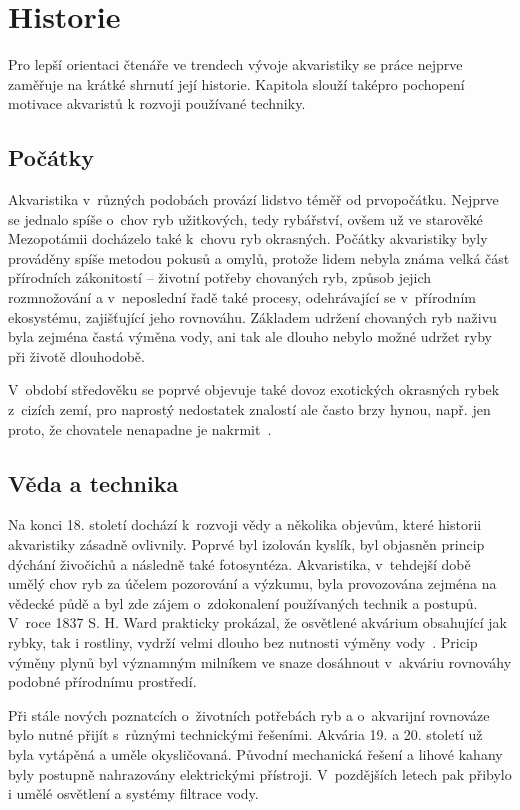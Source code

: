\section{Historie}
    Pro lepší orientaci čtenáře ve trendech vývoje akvaristiky se práce nejprve zaměřuje na krátké shrnutí její historie. Kapitola slouží taképro pochopení motivace akvaristů k rozvoji používané techniky.
\subsection{Počátky}
Akvaristika v~různých podobách provází lidstvo téměř od prvopočátku. Nejprve se jednalo spíše o~chov ryb užitkových, tedy rybářství, ovšem už ve starověké Mezopotámii docházelo také k~chovu ryb okrasných. Počátky akvaristiky byly prováděny spíše metodou pokusů a omylů, protože lidem nebyla známa velká část přírodních zákonitostí -- životní potřeby chovaných ryb, způsob jejich rozmnožování a v~neposlední řadě také procesy, odehrávající se v~přírodním ekosystému, zajišťující jeho rovnováhu. Základem udržení chovaných ryb naživu byla zejména častá výměna vody, ani tak ale dlouho nebylo možné udržet ryby při životě dlouhodobě. 

V~období středověku se poprvé objevuje také dovoz exotických okrasných rybek z~cizích zemí, pro naprostý nedostatek znalostí ale často brzy hynou, např. jen proto, že chovatele nenapadne je nakrmit~\cite{vitek_akvaristika}.

\subsection{Věda a technika}
Na konci 18. století dochází k~rozvoji vědy a několika objevům, které historii akvaristiky zásadně ovlivnily. Poprvé byl izolován kyslík, byl objasněn princip dýchání živočichů a následně také fotosyntéza. Akvaristika, v~tehdejší době umělý chov ryb za účelem pozorování a výzkumu, byla provozována zejména na vědecké půdě a byl zde zájem o~zdokonalení používaných technik a postupů. V~roce 1837 S. H. Ward prakticky prokázal, že osvětlené akvárium obsahující jak rybky, tak i rostliny, vydrží velmi dlouho bez nutnosti výměny vody~\cite{vitek_akvaristika}. Pricip výměny plynů byl významným milníkem ve snaze dosáhnout v~akváriu rovnováhy podobné přírodnímu prostředí. 

Při stále nových poznatcích o~životních potřebách ryb a o~akvarijní rovnováze bylo nutné přijít s~různými technickými řešeními. Akvária 19. a 20. století už byla vytápěná a uměle okysličovaná. Původní mechanická řešení a lihové kahany byly postupně nahrazovány elektrickými přístroji. V~pozdějších letech pak přibylo i umělé osvětlení a systémy filtrace vody. 